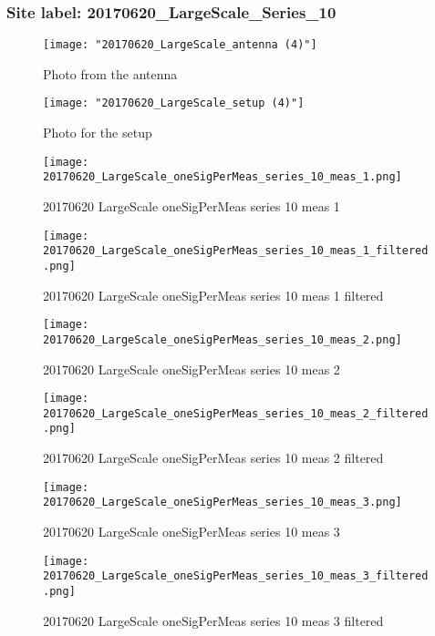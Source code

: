 \subsubsection{Site label: 20170620\_LargeScale\_Series\_10}
\begin{figure}[ht] \caption{Photo from the antenna}
\texttt{[image: "20170620\_LargeScale\_antenna (4)"]}\centering\end{figure}
\begin{figure}[ht] \caption{Photo for the setup}
\texttt{[image: "20170620\_LargeScale\_setup (4)"]}\centering\end{figure}
\begin{figure}[ht] \caption{20170620 LargeScale oneSigPerMeas series 10 meas 1}
\texttt{[image: 20170620\_LargeScale\_oneSigPerMeas\_series\_10\_meas\_1.png]}\centering\end{figure}
\begin{figure}[ht] \caption{20170620 LargeScale oneSigPerMeas series 10 meas 1 filtered}
\texttt{[image: 20170620\_LargeScale\_oneSigPerMeas\_series\_10\_meas\_1\_filtered.png]}\centering\end{figure}
\begin{figure}[ht] \caption{20170620 LargeScale oneSigPerMeas series 10 meas 2}
\texttt{[image: 20170620\_LargeScale\_oneSigPerMeas\_series\_10\_meas\_2.png]}\centering\end{figure}
\begin{figure}[ht] \caption{20170620 LargeScale oneSigPerMeas series 10 meas 2 filtered}
\texttt{[image: 20170620\_LargeScale\_oneSigPerMeas\_series\_10\_meas\_2\_filtered.png]}\centering\end{figure}
\begin{figure}[ht] \caption{20170620 LargeScale oneSigPerMeas series 10 meas 3}
\texttt{[image: 20170620\_LargeScale\_oneSigPerMeas\_series\_10\_meas\_3.png]}\centering\end{figure}
\begin{figure}[ht] \caption{20170620 LargeScale oneSigPerMeas series 10 meas 3 filtered}
\texttt{[image: 20170620\_LargeScale\_oneSigPerMeas\_series\_10\_meas\_3\_filtered.png]}\centering\end{figure}
\clearpage
